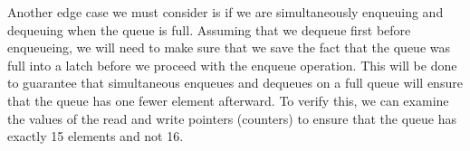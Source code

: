 \documentclass[12pt]{report}
\begin{document}
Another edge case we must consider is if we are simultaneously enqueuing and dequeuing when the queue is full. Assuming that we dequeue first before enqueueing, we will need to make sure that we save the fact that the queue was full into a latch before we proceed with the enqueue operation. This will be done to guarantee that simultaneous enqueues and dequeues on a full queue will ensure that the queue has one fewer element afterward. To verify this, we can examine the values of the read and write pointers (counters) to ensure that the queue has exactly 15 elements and not 16.
\end{document}

